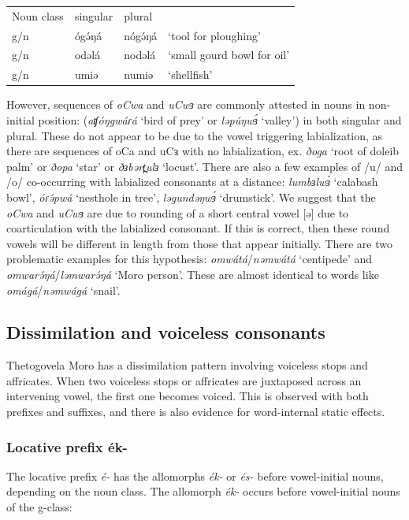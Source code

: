 \ea
\begin{tabular}[t]{llll}
Noun class		&	singular&	plural\\
g/n	&	ógə́ŋá	&	nógə́ŋá	&	‘tool for ploughing’\\
g/n	&	odəlá	&	nodəlá	&	‘small gourd bowl for oil’\\
g/n	&	umiə	&	numiə	&	‘shellfish’\\
\end{tabular}
\z

However, sequences of \textit{oCwa} and \textit{uCwɜ} are commonly attested in nouns in non-initial position: (\textit{aʧóŋgwáɾá} ‘bird of prey’ or \textit{ləpúŋwɜ́} ‘valley’) in both singular and plural. These do not appear to be due to the vowel triggering labialization, as there are sequences of oCa and uCɜ with no labialization, ex. \textit{ðoga} ‘root of doleib palm’ or \textit{ðopa} ‘star’ or \textit{ðɜbərt̪ulɜ} ‘locust’. There are also a few examples of /u/ and /o/ co-occurring with labialized consonants at a distance: \textit{lumbɜlwɜ́} ‘calabash bowl’, \textit{óɾə́pwá} ‘nesthole in tree’, \textit{ləgundəŋwɜ́} ‘drumstick’. We suggest that the \textit{oCwa} and \textit{uCwɜ} are due to rounding of a short central vowel [ə] due to coarticulation with the labialized consonant. If this is correct, then these round vowels will be different in length from those that appear initially. There are two problematic examples for this hypothesis: \textit{omwátá}/\textit{nəmwátá} ‘centipede’ and \textit{omwarə́ŋá}/\textit{ləmwarə́ŋá} ‘Moro person’. These are almost identical to words like \textit{omágá}/\textit{nəmwágá} ‘snail’.

\subsection{Dissimilation and voiceless consonants}
Thetogovela Moro has a dissimilation pattern involving voiceless stops and affricates. When two voiceless stops or affricates are juxtaposed across an intervening vowel, the first one becomes voiced. This is observed with both prefixes and suffixes, and there is also evidence for word-internal static effects. 

\subsubsection{Locative prefix ék-}
The locative prefix \textit{é-} has the allomorphs \textit{ék-} or \textit{és-} before vowel-initial nouns, depending on the noun class. The allomorph \textit{ék-} occurs before vowel-initial nouns of the g-class:

